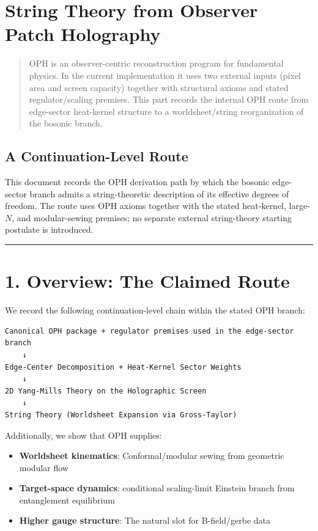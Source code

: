 \section{String Theory from Observer Patch Holography}\label{string-theory-from-observer-patch-holography}

\begin{quote}
OPH is an observer-centric reconstruction program for fundamental physics. In the current implementation it uses two external inputs (pixel area and screen capacity) together with structural axioms and stated regulator/scaling premises. This part records the internal OPH route from edge-sector heat-kernel structure to a worldsheet/string reorganization of the bosonic branch.
\end{quote}

\subsection{A Continuation-Level Route}\label{a-complete-derivation}

This document records the OPH derivation path by which the bosonic edge-sector branch admits a string-theoretic description of its effective degrees of freedom. The route uses OPH axioms together with the stated heat-kernel, large-\(N\), and modular-sewing premises; no separate external string-theory starting postulate is introduced.

\begin{center}\rule{0.5\linewidth}{0.5pt}\end{center}

\section{1. Overview: The Claimed Route}\label{1-overview-what-we-derive}

We record the following continuation-level chain within the stated OPH branch:

\begin{verbatim}
Canonical OPH package + regulator premises used in the edge-sector branch
    ↓
Edge-Center Decomposition + Heat-Kernel Sector Weights
    ↓
2D Yang-Mills Theory on the Holographic Screen
    ↓
String Theory (Worldsheet Expansion via Gross-Taylor)
\end{verbatim}

Additionally, we show that OPH supplies:

\begin{itemize}
\tightlist
\item
  \textbf{Worldsheet kinematics}: Conformal/modular sewing from geometric modular flow
\item
  \textbf{Target-space dynamics}: conditional scaling-limit Einstein branch from entanglement equilibrium
\item
  \textbf{Higher gauge structure}: The natural slot for B-field/gerbe data
\end{itemize}


